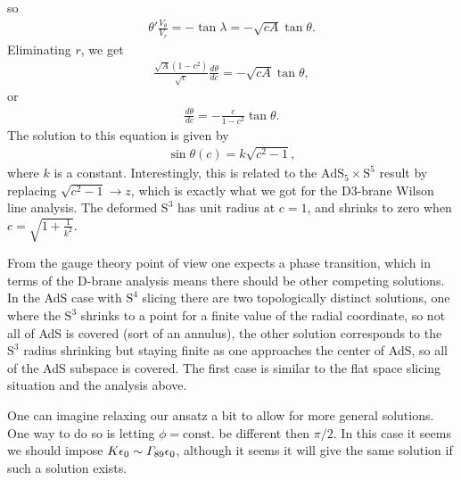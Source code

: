 \documentclass[11pt]{article}
\let\oldGamma=\Gamma
\renewcommand{\Gamma}{\mathnormal{\oldGamma}}
\newcommand{\Sphere}{\mathrm{S}}  %
\newcommand{\AdS}{\mathrm{AdS}}
\begin{document}
so
\begin{align}
\theta' \frac{V_\theta}{V_r} = -\tan\lambda = - \sqrt{c A}\tan\theta.
\end{align}
Eliminating $r$, we get
\begin{align}
\frac{\sqrt{A}(1-c^2)}{\sqrt{c}}\frac{d\theta}{d c} = - \sqrt{c A}\tan\theta,
\end{align}
or
\begin{align}
\frac{d\theta}{d c} = - \frac{c}{1-c^2}\tan\theta.
\end{align}
The solution to this equation is given by
\begin{align}
\sin \theta(c) = k \sqrt{c^2 - 1} ,
\end{align}
where $k$ is a constant.
Interestingly, this is related to the $\AdS_5 \times \Sphere^5$ result by replacing $\sqrt{c^2 - 1} \to z$, which is exactly what we got for the D3-brane Wilson line analysis.
The deformed $\Sphere^3$ has unit radius at $c=1$, and shrinks to zero when $c = \sqrt{1+\frac{1}{k^2}}$.

From the gauge theory point of view one expects a phase transition, which in terms of the D-brane analysis means there should be other competing solutions. In the AdS case with $\Sphere^4$ slicing there are two topologically distinct solutions, one where the $\Sphere^3$ shrinks to a point for a finite value of the radial coordinate, so not all of AdS is covered (sort of an annulus), the other solution corresponds to the $\Sphere^3$ radius shrinking but staying finite as one approaches the center of AdS, so all of the AdS subspace is covered.
The first case is similar to the flat space slicing situation and the analysis above.

One can imagine relaxing our ansatz a bit to allow for more general solutions.
One way to do so is letting $\phi = \text{const.}$ be different then $\pi/2$. In this case it seems we should impose $K \epsilon_0 \sim \Gamma_{89}\epsilon_0$, although it seems it will give the same solution if such a solution exists.
\end{document}
